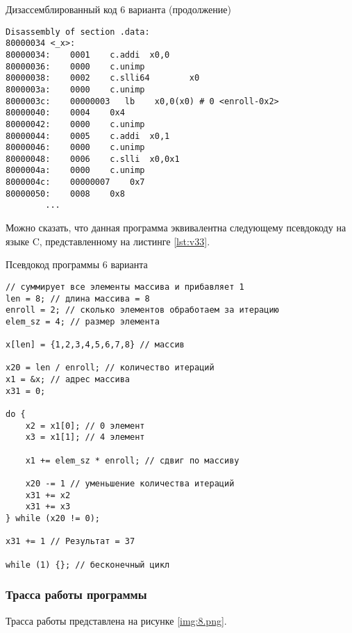 \newpage

\begin{code}
\caption{Дизассемблированный код 6 варианта (продолжение)}
\label{lst:v23}

\begin{verbatim}
Disassembly of section .data:
80000034 <_x>:
80000034:    0001    c.addi  x0,0
80000036:    0000    c.unimp
80000038:    0002    c.slli64        x0
8000003a:    0000    c.unimp
8000003c:    00000003	lb    x0,0(x0) # 0 <enroll-0x2>
80000040:    0004    0x4
80000042:    0000    c.unimp
80000044:    0005    c.addi  x0,1
80000046:    0000    c.unimp
80000048:    0006    c.slli  x0,0x1
8000004a:    0000    c.unimp
8000004c:    00000007    0x7
80000050:    0008    0x8
        ...

\end{verbatim}
\end{code}

\clearpage
Можно сказать, что данная программа эквивалентна следующему псевдокоду на языке C, представленному на листинге \ref{lst:v33}.

\begin{code}
\caption{Псевдокод программы 6 варианта}
\label{lst:v33}

\begin{verbatim}
// суммирует все элементы массива и прибавляет 1
len = 8; // длина массива = 8
enroll = 2; // сколько элементов обработаем за итерацию
elem_sz = 4; // размер элемента

x[len] = {1,2,3,4,5,6,7,8} // массив

x20 = len / enroll; // количество итераций
x1 = &x; // адрес массива
x31 = 0;

do {
    x2 = x1[0]; // 0 элемент
    x3 = x1[1]; // 4 элемент 

    x1 += elem_sz * enroll; // сдвиг по массиву

    x20 -= 1 // уменьшение количества итераций
    x31 += x2  
    x31 += x3 
} while (x20 != 0);

x31 += 1 // Результат = 37

while (1) {}; // бесконечный цикл
\end{verbatim}
\end{code}



\subsubsection*{Трасса работы программы}
Трасса работы представлена на рисунке \ref{img:8.png}.
\clearpage

